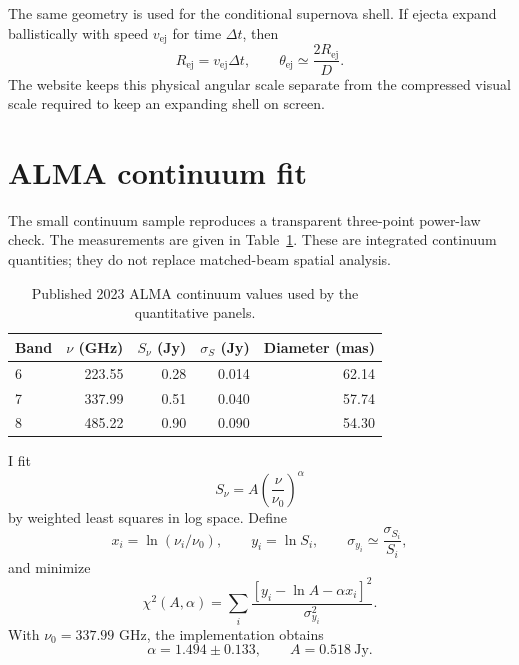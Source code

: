 \documentclass[11pt,a4paper]{article}
\begin{document}
The same geometry is used for the conditional supernova shell. If ejecta expand ballistically with speed $v_{\mathrm{ej}}$ for time $\Delta t$, then
\begin{equation}
R_{\mathrm{ej}}=v_{\mathrm{ej}}\Delta t,\qquad
\theta_{\mathrm{ej}}\simeq \frac{2R_{\mathrm{ej}}}{D}.
\end{equation}
The website keeps this physical angular scale separate from the compressed visual scale required to keep an expanding shell on screen.

\section{ALMA continuum fit}

The small continuum sample reproduces a transparent three-point power-law check. The measurements are given in Table~\ref{tab:alma}. These are integrated continuum quantities; they do not replace matched-beam spatial analysis.

\begin{table}[H]
\centering
\caption{Published 2023 ALMA continuum values used by the quantitative panels.}
\label{tab:alma}
\begin{tabular}{@{}lrrrr@{}}
\toprule
Band & $\nu$ (GHz) & $S_\nu$ (Jy) & $\sigma_S$ (Jy) & Diameter (mas) \\
\midrule
6 & 223.55 & 0.28 & 0.014 & 62.14 \\
7 & 337.99 & 0.51 & 0.040 & 57.74 \\
8 & 485.22 & 0.90 & 0.090 & 54.30 \\
\bottomrule
\end{tabular}
\end{table}

I fit
\begin{equation}
S_\nu=A\left(\frac{\nu}{\nu_0}\right)^\alpha
\end{equation}
by weighted least squares in log space. Define
\begin{equation}
x_i=\ln(\nu_i/\nu_0),\qquad y_i=\ln S_i,\qquad
\sigma_{y_i}\simeq \frac{\sigma_{S_i}}{S_i},
\end{equation}
and minimize
\begin{equation}
\chi^2(A,\alpha)=\sum_i\frac{[y_i-\ln A-\alpha x_i]^2}{\sigma_{y_i}^2}.
\end{equation}
With $\nu_0=337.99$ GHz, the implementation obtains
\begin{equation}
\alpha=1.494\pm0.133,\qquad A=0.518\ \mathrm{Jy}.
\end{equation}
\end{document}
